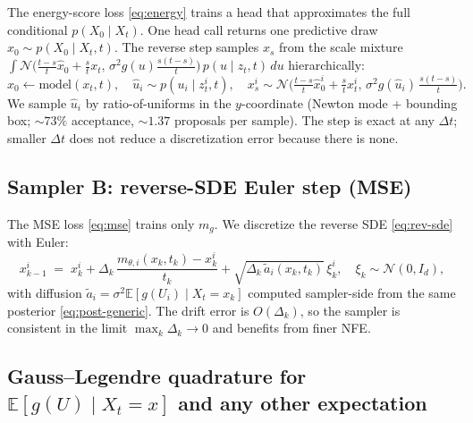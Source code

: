 \documentclass[11pt]{article}
\newcommand{\E}{\mathbb{E}}
\newcommand{\N}{\mathcal{N}}
\begin{document}
The energy-score loss \eqref{eq:energy} trains a head that approximates
the full conditional $p(X_0\mid X_t)$. One head call returns one
predictive draw $\hat x_0\sim p(X_0\mid X_t,t)$. The reverse step samples
$x_s$ from the scale mixture
$\int \N\big(\tfrac{t-s}{t}\hat x_0 + \tfrac{s}{t} x_t,\,\sigma^2 g(u)\tfrac{s(t-s)}{t}\big)\,p(u\mid z_t,t)\,du$
hierarchically:
\[
    \hat x_0 \leftarrow \text{model}(x_t,t),\quad
    \hat u_i \sim p(u_i\mid z_t^i,t),\quad
    x_s^i \sim \N\big(\tfrac{t-s}{t}\hat x_0^i + \tfrac{s}{t} x_t^i,\,\sigma^2 g(\hat u_i)\,\tfrac{s(t-s)}{t}\big).
\]
We sample $\hat u_i$ by ratio-of-uniforms in the $y$-coordinate (Newton
mode + bounding box; $\sim\!73\%$ acceptance, $\sim\!1.37$ proposals per
sample). The step is exact at any $\Delta t$; smaller $\Delta t$ does
not reduce a discretization error because there is none.

\subsection{Sampler B: reverse-SDE Euler step (MSE)}
\label{sec:sampler-mse}

The MSE loss \eqref{eq:mse} trains only $m_g$. We discretize the
reverse SDE \eqref{eq:rev-sde} with Euler:
\begin{equation}
    x_{k-1}^i \;=\; x_k^i + \Delta_k\,\frac{m_{\theta,i}(x_k,t_k) - x_k^i}{t_k}
    + \sqrt{\Delta_k\,\widetilde a_i(x_k,t_k)}\,\xi_k^i,\quad \xi_k\sim\N(0,I_d),
    \label{eq:euler}
\end{equation}
with diffusion $\widetilde a_i = \sigma^2 \E[g(U_i)\mid X_t=x_k]$
computed sampler-side from the same posterior \eqref{eq:post-generic}.
The drift error is $O(\Delta_k)$, so the sampler is consistent in the
limit $\max_k\Delta_k\to 0$ and benefits from finer NFE.

\subsection{Gauss--Legendre quadrature for $\E[g(U)\mid X_t=x]$ and any other expectation}
\label{sec:quadrature}
\end{document}
